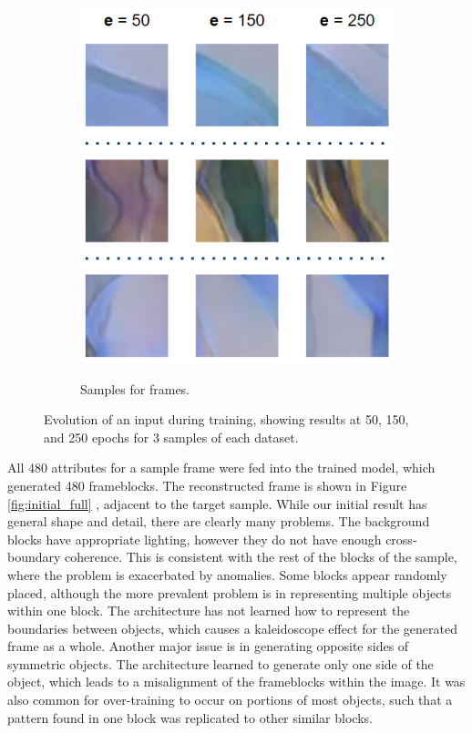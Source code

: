\documentclass[letterpaper]{article} %
\begin{document}
\begin{figure}[h!]
\begin{subfigure}{0.22\textwidth}
\begin{center}
\begin{minipage}[t]{0.95\linewidth}
\begin{centering}
{\includegraphics[width=\linewidth]{evolution_frame.png}}
\caption{Samples for frames.}
\label{fig:evolution_frame}
\end{centering}
\end{minipage}
\end{center}
\end{subfigure}
\caption{Evolution of an input during training, showing results at 50, 150, and 
250 epochs for 3 samples of each dataset.}
\label{fig:evolution}
\end{figure}

All 480 attributes for a sample frame were fed into the trained model, which 
generated 480 frameblocks. The reconstructed frame is shown in Figure 
\ref{fig:initial_full} , adjacent to the target sample. While our initial 
result has general shape and detail, there are clearly many problems.
The background blocks have appropriate lighting, however they do not have 
enough cross-boundary coherence. This is consistent with the rest of the blocks 
of the sample, where the problem is exacerbated by anomalies. Some blocks 
appear randomly placed, although the more prevalent problem is in representing 
multiple objects within one block. The architecture has not learned how to 
represent the boundaries between objects, which causes a kaleidoscope effect 
for the generated frame as a whole.
Another major issue is in generating opposite sides of symmetric objects. The 
architecture learned to generate only one side of the object, which leads to a 
misalignment of the frameblocks within the image. It was also common for 
over-training to occur on portions of most objects, such that a pattern 
found in one block was replicated to other similar blocks.
\end{document}
